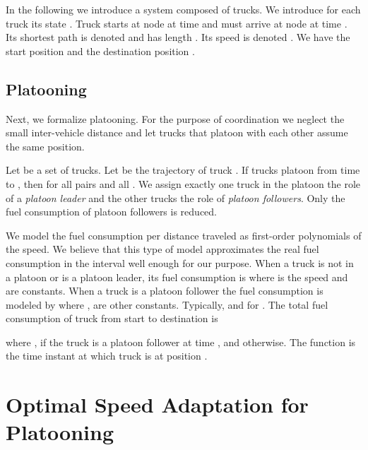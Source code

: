 \documentclass[letterpaper,10pt,conference,twocolumn]{IEEEtran}
\theoremstyle{definition}
\begin{document}
In the following we introduce a system composed of  trucks. We introduce for each truck  its state .  Truck  starts at node  at time  and must arrive at node  at time . Its shortest path is denoted  and has length . Its speed is denoted . We have the start position  and the destination position . 
 
\subsection*{Platooning}

Next, we formalize platooning. For the purpose of coordination we neglect the small inter-vehicle distance and let trucks that platoon with each other assume the same position.

Let  be a set of trucks. Let  be the trajectory of truck . If trucks  platoon from time  to , then  for all pairs  and all . 
We assign exactly one truck in the platoon the role of a \textit{platoon leader} and the other trucks the role of \textit{platoon followers}. Only the fuel consumption of platoon followers is reduced.

We model the fuel consumption per distance traveled as first-order polynomials of the speed.
We believe that this type of model approximates the real fuel consumption in the interval  well enough for our purpose.
When a truck is not in a platoon or is a platoon leader, its fuel consumption is  where  is the speed and  are constants. When a truck is a platoon follower the fuel consumption is modeled by  where ,  are other constants. Typically,  and  for .
The total fuel consumption of truck  from start to destination is

where , if the truck is a platoon follower at time , and  otherwise. The function  is the time instant at which truck  is at position . 


\section{Optimal Speed Adaptation for Platooning}
\label{sec:optimal_speed_adaption}
\end{document}
